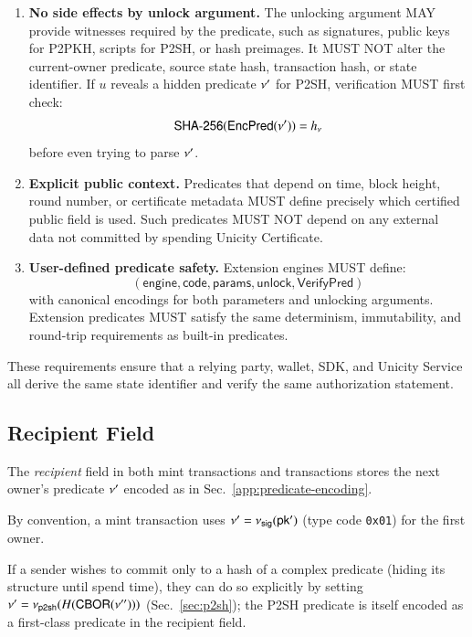 \begin{enumerate}
    \item \textbf{No side effects by unlock argument.}
    The unlocking argument MAY provide witnesses required by the predicate, such as signatures, public keys for P2PKH, scripts for P2SH, or hash preimages. It MUST NOT alter the current-owner predicate, source state hash, transaction hash, or state identifier. If $u$ reveals a hidden predicate $\nu'$ for P2SH, verification MUST first check:
    \[
      \mathsf{SHA\text{-}256}(\mathsf{EncPred}(\nu')) = h_\nu
    \]
    before even trying to parse $\nu'$.

    \item \textbf{Explicit public context.}
    Predicates that depend on time, block height, round number, or certificate metadata MUST define precisely which certified public field is used. Such predicates MUST NOT depend on any external data not committed by spending Unicity Certificate.

    \item \textbf{User-defined predicate safety.}
    Extension engines MUST define:
    \[
      (\mathsf{engine},\mathsf{code},\mathsf{params},\mathsf{unlock},\mathsf{VerifyPred})
    \]
    with canonical encodings for both parameters and unlocking arguments. Extension predicates MUST satisfy the same determinism,
  immutability, and round-trip requirements as built-in predicates.
  \end{enumerate}

  \noindent These requirements ensure that a relying party, wallet, SDK, and Unicity Service all derive the same state identifier and verify the same authorization statement.

\subsection{Recipient Field}

The \emph{recipient} field in both mint transactions and transactions stores the next owner's predicate $\nu'$ encoded as in Sec.~\ref{app:predicate-encoding}.

By convention, a mint transaction uses $\nu' = \nu_\mathsf{sig}(\mathsf{pk'})$ (type code \texttt{0x01}) for the first owner.

If a sender wishes to commit only to a hash of a complex predicate (hiding its structure until spend time), they can do so explicitly by setting $\nu' = \nu_\mathsf{p2sh}(H(\mathsf{CBOR}(\nu'')))$ (Sec.~\ref{sec:p2sh}); the P2SH predicate is itself encoded as a first-class predicate in the recipient field.


